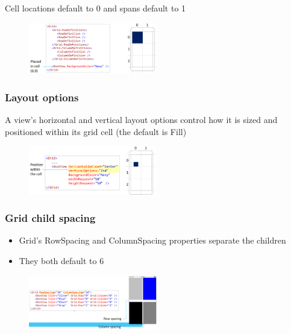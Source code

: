 \documentclass{article}
\begin{document}
Cell locations default to 0 and spans default to 1

\begin{figure}[H]
    \centering
    \includegraphics[width=0.5\textwidth]{xaml-grid-cell-span-defaults.png}
    \caption{}
\end{figure}

\subsubsection{Layout options}

A view's horizontal and vertical layout options control how it is sized and positioned within its grid cell (the default is Fill)

\begin{figure}[H]
    \centering
    \includegraphics[width=0.5\textwidth]{xaml-grid-layout.png}
    \caption{}
\end{figure}

\subsubsection{Grid child spacing}

\begin{itemize}
    \item Grid's RowSpacing and ColumnSpacing properties separate the children
    \item They both default to 6
\end{itemize}

\begin{figure}[H]
    \centering
    \includegraphics[width=0.5\textwidth]{xaml-grid-child-spacing.png}
    \caption{}
\end{figure}
\end{document}
